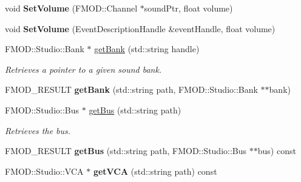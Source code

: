 \begin{DoxyCompactItemize}
\item 
\hypertarget{classDCEngine_1_1Systems_1_1AudioFMOD_aafd2f1a9ff50ba390c324ae4eac7bc04}{void {\bfseries Set\-Volume} (F\-M\-O\-D\-::\-Channel $\ast$sound\-Ptr, float volume)}\label{classDCEngine_1_1Systems_1_1AudioFMOD_aafd2f1a9ff50ba390c324ae4eac7bc04}

\item 
\hypertarget{classDCEngine_1_1Systems_1_1AudioFMOD_a166a673b4118f283b09d93006716b226}{void {\bfseries Set\-Volume} (Event\-Description\-Handle \&event\-Handle, float volume)}\label{classDCEngine_1_1Systems_1_1AudioFMOD_a166a673b4118f283b09d93006716b226}

\item 
F\-M\-O\-D\-::\-Studio\-::\-Bank $\ast$ \hyperlink{classDCEngine_1_1Systems_1_1AudioFMOD_a571388ad63c66873859ca886260b3391}{get\-Bank} (std\-::string handle)
\begin{DoxyCompactList}\small\item\em Retrieves a pointer to a given sound bank. \end{DoxyCompactList}\item 
\hypertarget{classDCEngine_1_1Systems_1_1AudioFMOD_a8723ee1355d7015ad233574de0732dd2}{F\-M\-O\-D\-\_\-\-R\-E\-S\-U\-L\-T {\bfseries get\-Bank} (std\-::string path, F\-M\-O\-D\-::\-Studio\-::\-Bank $\ast$$\ast$bank)}\label{classDCEngine_1_1Systems_1_1AudioFMOD_a8723ee1355d7015ad233574de0732dd2}

\item 
F\-M\-O\-D\-::\-Studio\-::\-Bus $\ast$ \hyperlink{classDCEngine_1_1Systems_1_1AudioFMOD_a6a258f8de2af79c25ce96642a03e6851}{get\-Bus} (std\-::string path)
\begin{DoxyCompactList}\small\item\em Retrieves the bus. \end{DoxyCompactList}\item 
\hypertarget{classDCEngine_1_1Systems_1_1AudioFMOD_acbea7bbdf138165c62d1419397f08827}{F\-M\-O\-D\-\_\-\-R\-E\-S\-U\-L\-T {\bfseries get\-Bus} (std\-::string path, F\-M\-O\-D\-::\-Studio\-::\-Bus $\ast$$\ast$bus) const }\label{classDCEngine_1_1Systems_1_1AudioFMOD_acbea7bbdf138165c62d1419397f08827}

\item 
\hypertarget{classDCEngine_1_1Systems_1_1AudioFMOD_a7a944a1adb6fec6891dbc544a565de78}{F\-M\-O\-D\-::\-Studio\-::\-V\-C\-A $\ast$ {\bfseries get\-V\-C\-A} (std\-::string path) const }\label{classDCEngine_1_1Systems_1_1AudioFMOD_a7a944a1adb6fec6891dbc544a565de78}


\end{DoxyCompactItemize}
